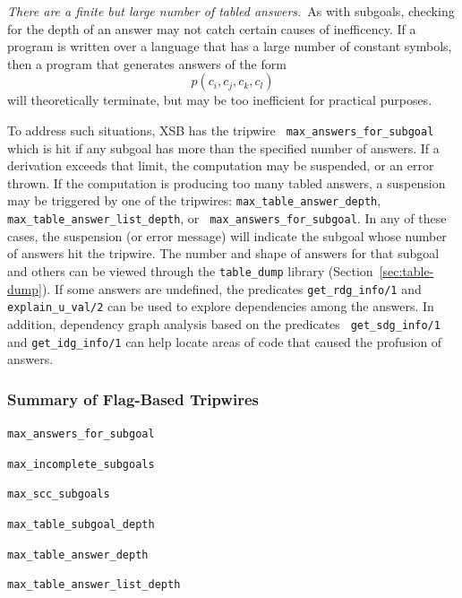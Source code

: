 \item {\em There are a finite but large number of tabled answers.}\ As
  with subgoals, checking for the depth of an answer may not catch
  certain causes of inefficency. If a program is written over a
  language that has a large number of constant symbols, then a program
  that generates answers of the form
\[
   p(c_i,c_j,c_k,c_l)
\]
  will theoretically terminate, but may be too inefficient for
  practical purposes.  

  To address such situations, XSB has the tripwire {\tt
    max\_answers\_for\_subgoal} which is hit if any subgoal has more
  than the specified number of answers.  If a derivation exceeds that
  limit, the computation may be suspended, or an error thrown.
%
  If the computation is producing too
 many tabled answers, a suspension may be triggered by one of the
 tripwires: {\tt max\_table\_answer\_depth}, {\tt
   max\_table\_answer\_list\_depth}, or {\tt
   max\_answers\_for\_subgoal}.  In any of these cases, the suspension
 (or error message) will indicate the subgoal whose number of answers
 hit the tripwire.  The number and shape of answers for that subgoal
 and others can be viewed through the {\tt table\_dump} library
 (Section~\ref{sec:table-dump}).  If some answers are undefined, the
 predicates {\tt get\_rdg\_info/1} and {\tt explain\_u\_val/2} can be
 used to explore dependencies among the answers.  In addition,
 dependency graph analysis based on the predicates {\tt
   get\_sdg\_info/1} and {\tt get\_idg\_info/1} can help locate areas
 of code that caused the profusion of answers.

 \ei

\subsubsection{Summary of Flag-Based Tripwires}

\begin{description}

\item {\tt max\_answers\_for\_subgoal}

\item {\tt max\_incomplete\_subgoals}

\item {\tt max\_scc\_subgoals}

\item {\tt max\_table\_subgoal\_depth}

\item {\tt max\_table\_answer\_depth}

\item {\tt max\_table\_answer\_list\_depth}

\end{description}

